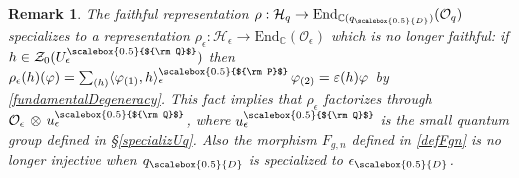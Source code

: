 \documentclass[11pt]{amsart}
\newtheorem{remark}[teo]{Remark}
\newcommand{\e}{\epsilon}
\newcommand{\qD}{q_{\scalebox{0.5}{D}}}
\newcommand{\eD}{\epsilon_{\scalebox{0.5}{D}}}
\newcommand{\Q}{{\scalebox{0.5}{${\rm Q}$}}}
\newcommand{\Pup}{{\scalebox{0.5}{${\rm P}$}}}
\begin{document}
\begin{remark}
{\rm The faithful representation $\rho : \mathcal{H}_q \to \mathrm{End}_{\mathbb{C}(\qD)}(\mathcal{O}_q)$ specializes to a representation $\rho_\e : \mathcal{H}_\e \to \mathrm{End}_{\mathbb{C}}(\mathcal{O}_\e)$ which is no longer faithful: if $h \in \mathcal{Z}_0(U_\e^\Q)$ then $\rho_\e(h)(\varphi) = \textstyle \sum_{(h)} \langle \varphi_{(1)}, h \rangle_\e^\Pup \, \varphi_{(2)} = \varepsilon(h)\varphi$ by \eqref{fundamentalDegeneracy}. This fact implies that $\rho_\e$ factorizes through $\mathcal{O}_\e \,\otimes \, u_\e^\Q$, where $u_\e^\Q$ is the small quantum group defined in \S\ref{specializUq}. Also the morphism $F_{g,n}$ defined in \eqref{defFgn} is no longer injective when $\qD$ is specialized to $\eD$.}
\end{remark}
\end{document}
